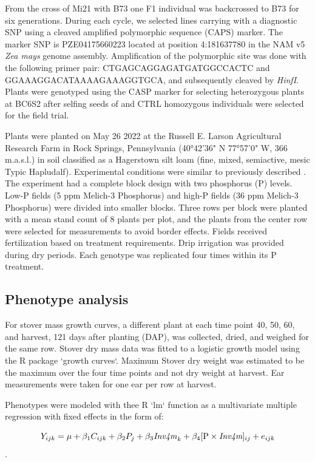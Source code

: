 From the cross of Mi21 with B73 one F1 individual was backcrossed to B73 for six generations. During each cycle, we selected lines carrying  \invfour with a diagnostic SNP using a cleaved amplified polymorphic sequence (CAPS) marker. 
The marker SNP is PZE04175660223 located at position 4:181637780 in the NAM v5 \textit{Zea mays} genome assembly.
Amplification of the polymorphic site was done with the following primer pair: CTGAGCAGGAGATGATGGCCACTC and GGAAAGGACATAAAAGAAAGGTGCA, and subsequently cleaved by \textit{HinfI}.
Plants were genotyped using the CASP marker for selecting heterozygous plants at BC6S2 after selfing seeds of \invfour and CTRL homozygous individuals were selected for the field trial.


Plants were planted on May 26 2022 at the Russell E. Larson Agricultural Research Farm in Rock Springs, Pennsylvania (40°42’36" N 77°57’0" W, 366 m.a.s.l.) in soil classified as a Hagerstown silt loam (fine, mixed, semiactive, mesic Typic Hapludalf).
Experimental conditions were similar to previously described \citep{strock2018}. 
The experiment had a complete block design with two phosphorus (P) levels. 
Low-P fields (5 ppm Melich-3 Phosphorus)  and  high-P fields (36 ppm Melich-3 Phosphorus) were divided into smaller blocks. 
Three rows per block were planted with a mean stand count of 8 plants per plot, and the plants from the center row were selected for measurements to avoid border effects. Fields received fertilization based on treatment requirements. 
Drip irrigation was provided during dry periods. 
Each genotype was replicated four times within its P treatment.


\subsection{Phenotype analysis}

For stover mass growth curves, a different plant at each time point 40, 50, 60, and harvest, 121 days after planting (DAP), was collected, dried, and weighed for the same row. Stover dry mass data was fitted to a logistic growth model using the R package `growth curves`.
Maximum Stover dry weight was estimated to be the maximum over the four time points and not dry weight at harvest.
Ear measurements were taken for one ear per row at harvest. 

Phenotypes were modeled with thee R `lm` function as a multivariate multiple regression with fixed effects in the form of:

$$Y_{ijk} = \mu+ \beta_{1}C_{ijk} + \beta_{2}P_j+ \beta_{3}  \text{\textit{Inv4m}}_k+ \beta_{4} [\text{P} \times \textit{\text{\textit{Inv4m}}}]_{ij} + e_{ijk}$$.

